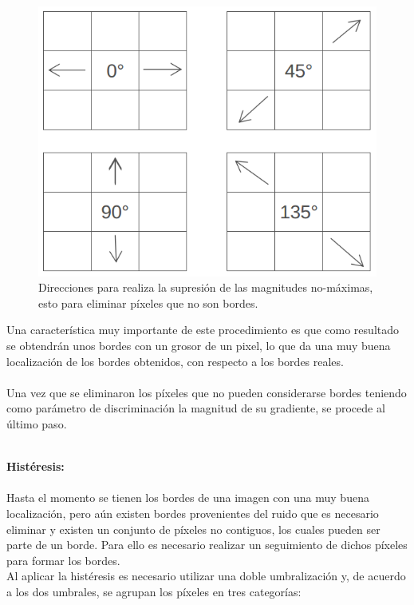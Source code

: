 \documentclass[conference]{IEEEtran}
\begin{document}
\begin{figure}[h]
	\setlength{\unitlength}{0.0125in}
	\centering
	\includegraphics[scale=0.30]{./images/supression.png}
	\caption{Direcciones para realiza la supresi\'on de las magnitudes no-m\'aximas, esto para eliminar p\'ixeles que no son bordes.}
\end{figure}

Una caracter\'istica muy importante de este procedimiento es que como resultado se obtendr\'an unos bordes con un grosor de un pixel, lo que da una muy buena localizaci\'on de los bordes obtenidos, con respecto a los bordes reales.\\\\
Una vez que se eliminaron los p\'ixeles que no pueden considerarse bordes teniendo como par\'ametro de discriminaci\'on la magnitud de su gradiente, se procede al \'ultimo paso.

\textbf{\\ Hist\'eresis: \\\\}
Hasta el momento se tienen los bordes de una imagen con una muy buena localizaci\'on, pero a\'un existen bordes provenientes del ruido que es necesario eliminar y existen un conjunto de p\'ixeles no contiguos, los cuales pueden ser parte de un borde. Para ello es necesario realizar un seguimiento de dichos p\'ixeles para formar los bordes.\\

Al aplicar la hist\'eresis es necesario utilizar una doble umbralizaci\'on y, de acuerdo a los dos umbrales, se agrupan los p\'ixeles en tres categor\'ias: \\
\end{document}
